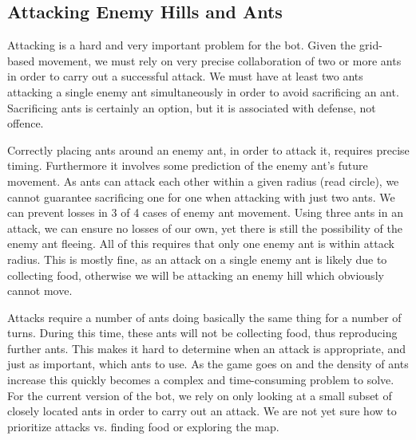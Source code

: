 \subsection{Attacking Enemy Hills and Ants}
Attacking is a hard and very important problem for the bot. Given the grid-based movement, we must rely on very precise collaboration of two or more ants in order to carry out a successful attack. We must have at least two ants attacking a single enemy ant simultaneously in order to avoid sacrificing an ant. Sacrificing ants is certainly an option, but it is associated with defense, not offence.

Correctly placing ants around an enemy ant, in order to attack it, requires precise timing. Furthermore it involves some prediction of the enemy ant's future movement. As ants can attack each other within a given radius (read circle), we cannot guarantee sacrificing one for one when attacking with just two ants. We can prevent losses in 3 of 4 cases of enemy ant movement. Using three ants in an attack, we can ensure no losses of our own, yet there is still the possibility of the enemy ant fleeing. All of this requires that only one enemy ant is within attack radius. This is mostly fine, as an attack on a single enemy ant is likely due to collecting food, otherwise we will be attacking an enemy hill which obviously cannot move.

Attacks require a number of ants doing basically the same thing for a number of turns. During this time, these ants will not be collecting food, thus reproducing further ants. This makes it hard to determine when an attack is appropriate, and just as important, which ants to use. As the game goes on and the density of ants increase this quickly becomes a complex and time-consuming problem to solve. For the current version of the bot, we rely on only looking at a small subset of closely located ants in order to carry out an attack. We are not yet sure how to prioritize attacks vs. finding food or exploring the map. 